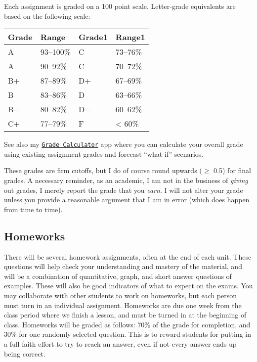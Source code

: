 \documentclass{article}
\begin{document}
Each assignment is graded on a 100 point scale. Letter-grade equivalents
are based on the following scale:

\begin{center}

\begin{tabular}{llll}
\toprule
Grade & Range & Grade1 & Range1\\
\midrule
A & 93–100\% & C & 73–76\%\\
A− & 90–92\% & C− & 70–72\%\\
B+ & 87–89\% & D+ & 67–69\%\\
B & 83–86\% & D & 63–66\%\\
B− & 80–82\% & D− & 60–62\%\\
\addlinespace
C+ & 77–79\% & F & < 60\%\\
\bottomrule
\end{tabular}
\end{center}

See also my
\href{https://ryansafner.shinyapps.io/324_grade_calculator/}{
\texttt{Grade\ Calculator}} app where you can calculate your overall
grade using existing assignment grades and forecast ``what if''
scenarios.

These grades are firm cutoffs, but I do of course round upwards
\((\geq\) 0.5) for final grades. A necessary reminder, as an academic, I
am not in the business of \emph{giving} out grades, I merely report the
grade that you \emph{earn}. I will not alter your grade unless you
provide a reasonable argument that I am in error (which does happen from
time to time).

\hypertarget{homeworks}{%
\subsection*{Homeworks}\label{homeworks}}

There will be several homework assignments, often at the end of each
unit. These questions will help check your understanding and mastery of
the material, and will be a combination of quantitative, graph, and
short answer questions of examples. These will also be good indicators
of what to expect on the exams. You may collaborate with other students
to work on homeworks, but each person must turn in an individual
assignment. Homeworks are due one week from the class period where we
finish a lesson, and must be turned in at the beginning of class.
Homeworks will be graded as follows: 70\% of the grade for completion,
and 30\% for one randomly selected question. This is to reward students
for putting in a full faith effort to try to reach an answer, even if
not every answer ends up being correct.
\end{document}

